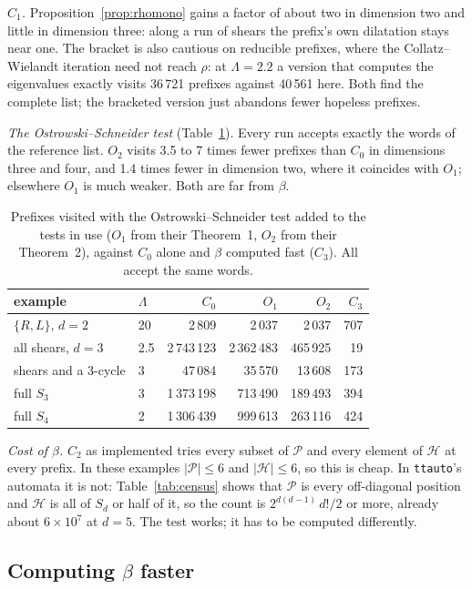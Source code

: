 \documentclass[11pt]{amsart}
\newcommand{\ttauto}{\texttt{ttauto}}
\newcommand{\Lam}{\Lambda}
\newcommand{\Pos}{\mathcal{P}}
\newcommand{\Hgp}{\mathcal{H}}
\theoremstyle{plain}
\theoremstyle{definition}
\begin{document}
\emph{$C_1$.}  Proposition~\ref{prop:rhomono} gains a factor of about two
in dimension two and little in dimension three: along a run of shears the
prefix's own dilatation stays near one.  The bracket is also cautious on
reducible prefixes, where the Collatz--Wielandt iteration need not reach
$\rho$: at $\Lam=2.2$ a version that computes the eigenvalues exactly
visits 36\,721 prefixes against 40\,561 here.  Both find the complete list;
the bracketed version just abandons fewer hopeless prefixes.

\emph{The Ostrowski--Schneider test} (Table~\ref{tab:os}).  Every run
accepts exactly the words of the reference list.  $O_2$ visits 3.5 to 7
times fewer prefixes than $C_0$ in dimensions three and four, and 1.4 times
fewer in dimension two, where it coincides with $O_1$; elsewhere $O_1$ is
much weaker.  Both are far from $\beta$.

\begin{table}[ht]
\centering
\small
\begin{tabular}{llrrrr}
\toprule
example & $\Lam$ & $C_0$ & $O_1$ & $O_2$ & $C_3$ \\
\midrule
$\{R,L\}$, $d=2$ & 20 & 2\,809 & 2\,037 & 2\,037 & 707 \\
all shears, $d=3$ & 2.5 & 2\,743\,123 & 2\,362\,483 & 465\,925 & 19 \\
shears and a 3-cycle & 3 & 47\,084 & 35\,570 & 13\,608 & 173 \\
full $S_3$ & 3 & 1\,373\,198 & 713\,490 & 189\,493 & 394 \\
full $S_4$ & 2 & 1\,306\,439 & 999\,613 & 263\,116 & 424 \\
\bottomrule
\end{tabular}
\caption{Prefixes visited with the Ostrowski--Schneider test added to the
  tests in use ($O_1$ from their Theorem~1, $O_2$ from their Theorem~2),
  against $C_0$ alone and $\beta$ computed fast ($C_3$).  All accept the same
  words.}
\label{tab:os}
\end{table}

\emph{Cost of $\beta$.}  $C_2$ as implemented tries every subset of $\Pos$
and every element of $\Hgp$ at every prefix.  In these examples
$|\Pos|\le6$ and $|\Hgp|\le6$, so this is cheap.  In \ttauto's automata it
is not: Table~\ref{tab:census} shows that $\Pos$ is every off-diagonal
position and $\Hgp$ is all of $S_d$ or half of it, so the count is
$2^{d(d-1)}\,d!/2$ or more, already about $6\times10^7$ at $d=5$.  The
test works; it has to be computed differently.

\subsection{Computing \texorpdfstring{$\beta$}{beta} faster}
\label{sec:fast}
\end{document}
